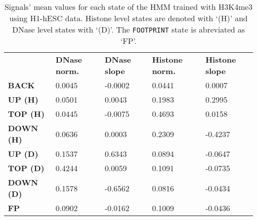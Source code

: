 \begin{table}[t]
\footnotesize
\begin{center}
\caption{Signals' mean values for each state of the HMM trained with H3K4me3 using H1-hESC data. Histone level states are denoted with `(H)' and DNase level states with `(D)'. The {\tt FOOTPRINT} state is abreviated as `FP'.}
\label{tab:hmmmean}
    \renewcommand{\arraystretch}{1.2}
    \begin{tabular}{ lllll }
        \hline
        & \textbf{DNase norm.} & \textbf{DNase slope} & \textbf{Histone norm.} & \textbf{Histone slope} \\
        \textbf{BACK}     & 0.0045 & -0.0002 & 0.0441 & 0.0007  \\
        \textbf{UP (H)}   & 0.0501 & 0.0043  & 0.1983 & 0.2995  \\
        \textbf{TOP (H)}  & 0.0445 & -0.0075 & 0.4693 & 0.0158  \\
        \textbf{DOWN (H)} & 0.0636 & 0.0003  & 0.2309 & -0.4237 \\
        \textbf{UP (D)}   & 0.1537 & 0.6343  & 0.0894 & -0.0647 \\
        \textbf{TOP (D)}  & 0.4244 & 0.0059  & 0.1091 & -0.0735 \\
        \textbf{DOWN (D)} & 0.1578 & -0.6562 & 0.0816 & -0.0434 \\
        \textbf{FP}       & 0.0902 & -0.0162 & 0.1009 & -0.0436 \\
        \hline
    \end{tabular}
\end{center}
\end{table}

